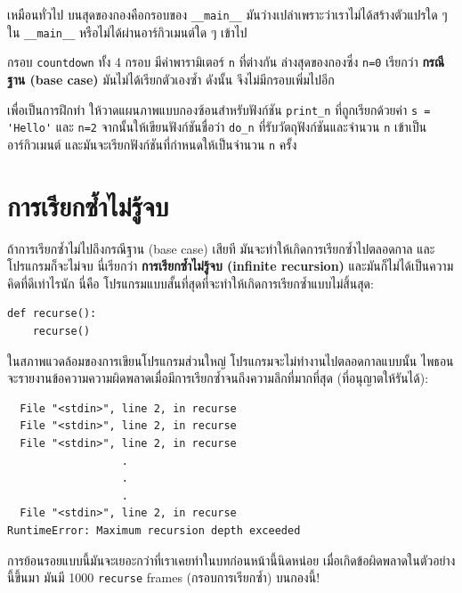 เหมือนทั่วไป บนสุดของกองคือกรอบของ \verb"__main__" มันว่างเปล่าเพราะว่าเราไม่ได้สร้างตัวแปรใด ๆ ใน \verb"__main__"
หรือไม่ได้ผ่านอาร์กิวเมนต์ใด ๆ เข้าไป

กรอบ {\tt countdown} ทั้ง 4 กรอบ มีค่าพารามิเตอร์ {\tt n} ที่ต่างกัน
ล่างสุดของกองซึ่ง {\tt n=0} เรียกว่า {\bf กรณีฐาน (base case)} มันไม่ได้เรียกตัวเองซ้ำ 
ดังนั้น จึงไม่มีกรอบเพิ่มไปอีก


เพื่อเป็นการฝึกทำ ให้วาดแผนภาพแบบกองซ้อนสำหรับฟังก์ชัน \verb|print_n| ที่ถูกเรียกด้วยค่า 
\verb"s = 'Hello'" และ {\tt n=2} จากนั้นให้เขียนฟังก์ชันชื่อว่า \verb"do_n" 
ที่รับวัตถุฟังก์ชันและจำนวน {\tt n} เข้าเป็นอาร์กิวเมนต์ และมันจะเรียกฟังก์ชันที่กำหนดให้เป็นจำนวน {\tt n} ครั้ง



\section{การเรียกซ้ำไม่รู้จบ} %

ถ้าการเรียกซ้ำไม่ไปถึงกรณีฐาน (base case) เสียที มันจะทำให้เกิดการเรียกซ้ำไปตลอดกาล
และโปรแกรมก็จะไม่จบ นี่เรียกว่า {\bf การเรียกซ้ำไม่รู้จบ (infinite recursion)}
และมันก็ไม่ได้เป็นความคิดที่ดีเท่าไรนัก นี่คือ โปรแกรมแบบสั้นที่สุดที่จะทำให้เกิดการเรียกซ้ำแบบไม่สิ้นสุด:

\begin{verbatim}
def recurse():
    recurse()
\end{verbatim}
%
ในสภาพแวดล้อมของการเขียนโปรแกรมส่วนใหญ่ โปรแกรมจะไม่ทำงานไปตลอดกาลแบบนั้น
ไพธอนจะรายงานข้อความความผิดพลาดเมื่อมีการเรียกซ้ำจนถึงความลึกที่มากที่สุด (ที่อนุญาตให้รันได้):

\begin{verbatim}
  File "<stdin>", line 2, in recurse
  File "<stdin>", line 2, in recurse
  File "<stdin>", line 2, in recurse
                  .   
                  .
                  .
  File "<stdin>", line 2, in recurse
RuntimeError: Maximum recursion depth exceeded
\end{verbatim}
%
การย้อนรอยแบบนี้มันจะเยอะกว่าที่เราเคยทำในบทก่อนหน้านี้นิดหน่อย 
เมื่อเกิดข้อผิดพลาดในตัวอย่างนี้ขึ้นมา มันมี 1000 {\tt recurse} frames (กรอบการเรียกซ้ำ) บนกองนี้!

